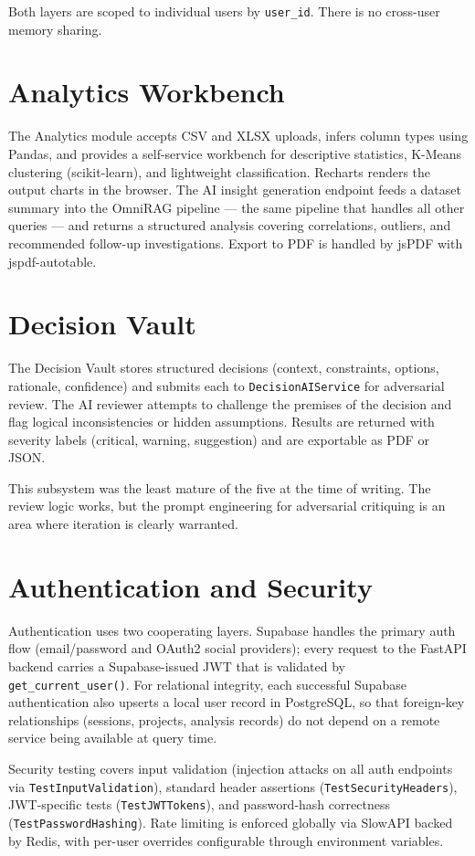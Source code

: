 Both layers are scoped to individual users by \texttt{user\_id}. There is no
cross-user memory sharing.

\section{Analytics Workbench}
\label{sec:analytics}

The Analytics module accepts CSV and XLSX uploads, infers column types using
Pandas, and provides a self-service workbench for descriptive statistics,
K-Means clustering (scikit-learn), and lightweight classification. Recharts
renders the output charts in the browser. The AI insight generation endpoint
feeds a dataset summary into the OmniRAG pipeline --- the same pipeline that
handles all other queries --- and returns a structured analysis covering
correlations, outliers, and recommended follow-up investigations. Export to
PDF is handled by jsPDF with jspdf-autotable.

\section{Decision Vault}
\label{sec:decision}

The Decision Vault stores structured decisions (context, constraints, options,
rationale, confidence) and submits each to \texttt{DecisionAIService} for
adversarial review. The AI reviewer attempts to challenge the premises of the
decision and flag logical inconsistencies or hidden assumptions. Results are
returned with severity labels (critical, warning, suggestion) and are
exportable as PDF or JSON.

This subsystem was the least mature of the five at the time of writing. The
review logic works, but the prompt engineering for adversarial critiquing is an
area where iteration is clearly warranted.

\section{Authentication and Security}
\label{sec:security}

Authentication uses two cooperating layers. Supabase handles the primary auth
flow (email/password and OAuth2 social providers); every request to the FastAPI
backend carries a Supabase-issued JWT that is validated by
\texttt{get\_current\_user()}. For relational integrity, each successful Supabase
authentication also upserts a local user record in PostgreSQL, so that
foreign-key relationships (sessions, projects, analysis records) do not depend
on a remote service being available at query time.

Security testing covers input validation (injection attacks on all auth
endpoints via \texttt{TestInputValidation}), standard header assertions
(\texttt{TestSecurityHeaders}), JWT-specific tests (\texttt{TestJWTTokens}),
and password-hash correctness (\texttt{TestPasswordHashing}). Rate limiting
is enforced globally via SlowAPI backed by Redis, with per-user overrides
configurable through environment variables.

